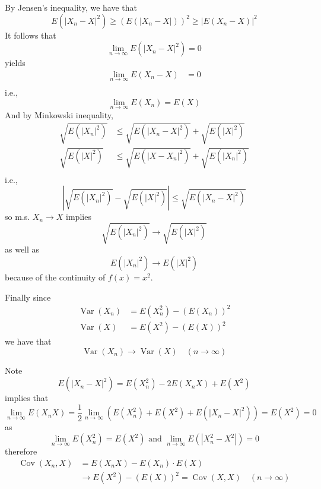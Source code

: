 \documentclass{homework}
\DeclareMathOperator{\var}{Var}
\DeclareMathOperator{\cov}{Cov}
\begin{document}
    \problem
    \begin{subproblem}
        \item
        By Jensen's inequality, we have that
        \[E(|X_n-X|^2)\geq (E(|X_n-X|))^2\geq |E(X_n-X)|^2\]
        It follows that 
        \[\lim_{n\to\infty}E(|X_n-X|^2)=0\]
        yields
        \[\begin{aligned}
            \lim_{n\to\infty}E(X_n-X)&=0\\
        \end{aligned}\]
        i.e.,
        \[\lim_{n\to\infty}E(X_n)=E(X)\]
        And by Minkowski inequality,
        \[\begin{aligned}
            \sqrt{E(|X_n|^2)}&\leq\sqrt{E(|X_n-X|^2)}+\sqrt{E(|X|^2)}\\
            \sqrt{E(|X|^2)}&\leq\sqrt{E(|X-X_n|^2)}+\sqrt{E(|X_n|^2)}\\
        \end{aligned}\]
        i.e.,
        \[\left|\sqrt{E(|X_n|^2)}-\sqrt{E(|X|^2)}\right|
        \leq\sqrt{E(|X_n-X|^2)}\]
        so m.s. $X_n\to X$ implies
        \[\sqrt{E(|X_n|^2)}\to\sqrt{E(|X|^2)}\]
        as well as
        \[E(|X_n|^2)\to E(|X|^2)\]
        because of the continuity of $f(x)=x^2$.

        Finally since
        \[\begin{aligned}
            \var(X_n)&=E(X_n^2)-(E(X_n))^2\\
            \var(X)&=E(X^2)-(E(X))^2
        \end{aligned}\]
        we have that
        \[\var(X_n)\to\var(X)\quad(n\to\infty)\]

        \item
        Note
        \[E(|X_n-X|^2)=E(X_n^2)-2E(X_nX)+E(X^2)\]
        implies that
        \[\lim_{n\to\infty}E(X_nX)
        =\frac{1}{2}\lim_{n\to\infty}\left(E(X_n^2)+E(X^2)+E(|X_n-X|^2)\right)
        =E(X^2)=0\]
        as
        \[\lim_{n\to\infty}E(X_n^2)=E(X^2)
        \text{ and }
        \lim_{n\to\infty}E(|X_n^2-X^2|)=0\]
        therefore
        \[\begin{aligned}
            \cov(X_n,X)&=E(X_nX)-E(X_n)\cdot E(X)\\
            &\to E(X^2)-(E(X))^2=\cov(X,X)\quad(n\to\infty)
        \end{aligned}\]
    \end{subproblem}
\end{document}
